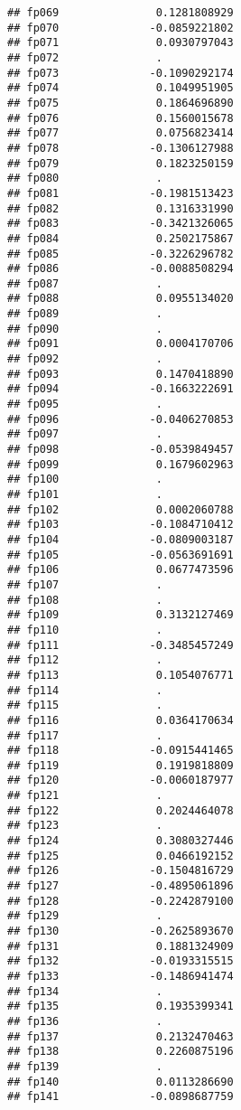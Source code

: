 \documentclass[]{article}
\begin{document}
\begin{verbatim}
## fp069               0.1281808929
## fp070              -0.0859221802
## fp071               0.0930797043
## fp072               .           
## fp073              -0.1090292174
## fp074               0.1049951905
## fp075               0.1864696890
## fp076               0.1560015678
## fp077               0.0756823414
## fp078              -0.1306127988
## fp079               0.1823250159
## fp080               .           
## fp081              -0.1981513423
## fp082               0.1316331990
## fp083              -0.3421326065
## fp084               0.2502175867
## fp085              -0.3226296782
## fp086              -0.0088508294
## fp087               .           
## fp088               0.0955134020
## fp089               .           
## fp090               .           
## fp091               0.0004170706
## fp092               .           
## fp093               0.1470418890
## fp094              -0.1663222691
## fp095               .           
## fp096              -0.0406270853
## fp097               .           
## fp098              -0.0539849457
## fp099               0.1679602963
## fp100               .           
## fp101               .           
## fp102               0.0002060788
## fp103              -0.1084710412
## fp104              -0.0809003187
## fp105              -0.0563691691
## fp106               0.0677473596
## fp107               .           
## fp108               .           
## fp109               0.3132127469
## fp110               .           
## fp111              -0.3485457249
## fp112               .           
## fp113               0.1054076771
## fp114               .           
## fp115               .           
## fp116               0.0364170634
## fp117               .           
## fp118              -0.0915441465
## fp119               0.1919818809
## fp120              -0.0060187977
## fp121               .           
## fp122               0.2024464078
## fp123               .           
## fp124               0.3080327446
## fp125               0.0466192152
## fp126              -0.1504816729
## fp127              -0.4895061896
## fp128              -0.2242879100
## fp129               .           
## fp130              -0.2625893670
## fp131               0.1881324909
## fp132              -0.0193315515
## fp133              -0.1486941474
## fp134               .           
## fp135               0.1935399341
## fp136               .           
## fp137               0.2132470463
## fp138               0.2260875196
## fp139               .           
## fp140               0.0113286690
## fp141              -0.0898687759

\end{verbatim}
\end{document}
